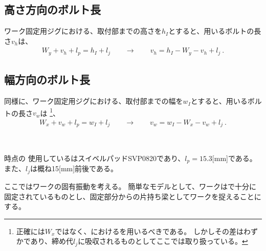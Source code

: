 \subsection{高さ方向のボルト長}
ワーク固定用ジグにおける、\FixtureBolt 取付部までの高さを$h_I$とすると、用いるボルトの長さ$v_h$は、
\begin{align*}
  W_y+v_h+l_p = h_I+l_j
  \qquad\longrightarrow\qquad
  v_h = h_I-W_y-v_h+l_j\ .
\end{align*}


\subsection{幅方向のボルト長}
同様に、ワーク固定用ジグにおける、\FixtureBolt 取付部までの幅を$w_I$とすると、用いるボルトの長さ$v_w$は
\footnote{正確には\ACOD$W_x$ではなく、\ReceiverPlate における\HorizontalOD を用いるべきである。
しかしその差はわずかであり、締め代$l_j$に吸収されるものとしてここでは取り扱っている。}、
\begin{align*}
  W_x+v_w+l_p = w_I+l_j
  \qquad\longrightarrow\qquad
  v_w = w_I-W_x-v_w+l_j\ .
\end{align*}

~\vfill
\begin{\Columnname}{\dateFixtureBolt 時点の\FixtureBolt}
使用している\FixtureBolt はスイベルパッドSVP0820であり、$l_p = 15.3$[mm]である。
また、$l_j$は概ね15[mm]前後である。
\end{\Columnname}




\clearpage
ここではワークの固有振動を考える。
簡単なモデルとして、ワークは\Jig で十分に固定されているものとし、固定部分からの片持ち梁としてワークを捉えることにする。

